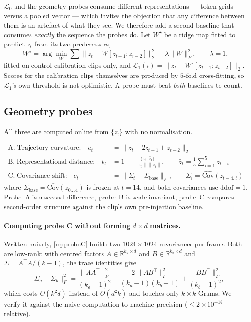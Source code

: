 $\mathcal{L}_0$ and the geometry probes consume different representations ---
token grids versus a pooled vector --- which invites the objection that any
difference between them is an artefact of what they see. We therefore add a
second baseline that consumes \emph{exactly} the sequence the probes do. Let
$W^\star$ be a ridge map fitted to predict $z_t$ from its two predecessors,
\begin{equation}
W^\star = \arg\min_{W} \sum \bigl\lVert z_t - W[z_{t-1}; z_{t-2}] \bigr\rVert_2^2
+ \lambda \lVert W \rVert_F^2 , \qquad \lambda = 1,
\end{equation}
fitted on control-calibration clips only, and
$\mathcal{L}_1(t) = \lVert z_t - W^\star[z_{t-1};z_{t-2}] \rVert_2$. Scores for
the calibration clips themselves are produced by $5$-fold cross-fitting, so
$\mathcal{L}_1$'s own threshold is not optimistic. A probe must beat
\emph{both} baselines to count.

\subsection{Geometry probes}

All three are computed online from $\{z_t\}$ with no normalisation.

\begin{align}
\text{A. Trajectory curvature:}\quad
  a_t &= \bigl\lVert z_t - 2 z_{t-1} + z_{t-2} \bigr\rVert_2
  \label{eq:probeA}\\[2pt]
\text{B. Representational distance:}\quad
  b_t &= 1 - \frac{\langle z_t,\ \bar z_t \rangle}{\lVert z_t\rVert\,\lVert \bar z_t\rVert},
  \qquad \bar z_t = \tfrac{1}{5}\textstyle\sum_{i=1}^{5} z_{t-i}
  \label{eq:probeB}\\[2pt]
\text{C. Covariance shift:}\quad
  c_t &= \bigl\lVert \Sigma_t - \Sigma_{\mathrm{base}} \bigr\rVert_F,
  \qquad \Sigma_t = \widehat{\mathrm{Cov}}(z_{t-4..t})
  \label{eq:probeC}
\end{align}
where $\Sigma_{\mathrm{base}} = \widehat{\mathrm{Cov}}(z_{0..14})$ is frozen at
$t=14$, and both covariances use $\mathrm{ddof}=1$. Probe~A is a second
difference, probe~B is scale-invariant, probe~C compares second-order structure
against the clip's own pre-injection baseline.

\paragraph{Computing probe C without forming $d \times d$ matrices.}
Written naively, \eqref{eq:probeC} builds two $1024\times1024$ covariances per
frame. Both are low-rank: with centred factors $A \in \mathbb{R}^{k_a \times d}$
and $B \in \mathbb{R}^{k_b \times d}$ and $\Sigma = A^\top A/(k{-}1)$, the trace
identities give
\begin{equation}
\lVert \Sigma_a - \Sigma_b \rVert_F^2 =
\frac{\lVert AA^\top \rVert_F^2}{(k_a{-}1)^2}
- \frac{2\,\lVert AB^\top \rVert_F^2}{(k_a{-}1)(k_b{-}1)}
+ \frac{\lVert BB^\top \rVert_F^2}{(k_b{-}1)^2},
\end{equation}
which costs $O(k^2 d)$ instead of $O(d^2 k)$ and touches only $k \times k$
Grams. We verify it against the naive computation to machine precision
($\leq 2\times10^{-16}$ relative).


